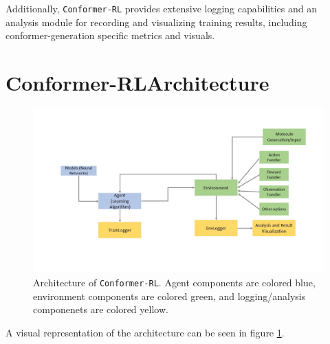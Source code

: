 \documentclass[twoside,11pt]{article}
\newcommand{\code}[1]{\texttt{#1}}
\newcommand{\titleofpaper}{Conformer-RL}
\begin{document}
Additionally, \code{\titleofpaper} provides extensive logging capabilities and an analysis module for recording and visualizing training results, including conformer-generation specific metrics and visuals.

\section{\titleofpaper Architecture}
\begin{figure}[h]
  \centering
  \includegraphics[width=\textwidth]{architectures.jpg}
  \caption{Architecture of \code{\titleofpaper}. Agent components are colored blue, environment components are colored green, and logging/analysis componenets are colored yellow.}
  \label{fig:architecture}
\end{figure}
  A visual representation of the architecture can be seen in figure \ref{fig:architecture}.
\end{document}
